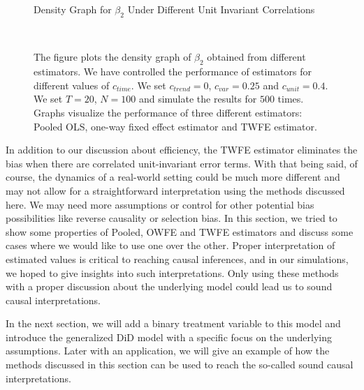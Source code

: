 \documentclass[12pt, a4paper]{article}
\begin{document}
\begin{figure}[H]
    \caption{Density Graph for $ \beta_2 $ Under Different Unit Invariant Correlations}
     \\
    \caption*{\scriptsize{The figure plots the density graph of $\beta_2$
    obtained from different estimators. We have controlled the performance of
    estimators for different values of $c_{time}$. We set $c_{trend} = 0$, $c_{var} = 0.25$
    and $c_{unit} = 0.4$. We set $T = 20$, $N = 100$ and simulate the results
    for $500$ times. Graphs visualize the performance
    of three different estimators: Pooled OLS, one-way fixed effect estimator and
    TWFE estimator.
    }
    \label{fig:c4}}
\end{figure}

In addition to our discussion about efficiency, the TWFE estimator eliminates the bias when there are correlated unit-invariant error terms.
With that being said, of course, the dynamics of a real-world setting could be much more different and may not allow for a straightforward interpretation using the methods discussed here.
We may need more assumptions or control for other potential bias possibilities like reverse causality or selection bias. In this section, we tried to show some properties of Pooled, OWFE and
TWFE estimators and discuss some cases where we would like to use one over the other. Proper interpretation of estimated values is critical to reaching causal inferences, and in our simulations, we hoped to give insights into such interpretations. Only using these methods with a proper discussion about the underlying model could lead us to sound causal interpretations.

In the next section, we will add a binary treatment variable to this model and introduce the generalized DiD model with a  specific focus on the underlying assumptions. Later with an application, we will give an example of how the methods discussed in this section can be used to reach the so-called sound causal interpretations.
\end{document}
